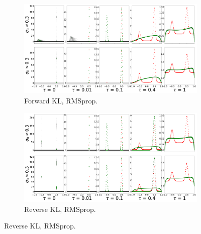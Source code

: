 \documentclass{article}
\begin{document}
\begin{figure}[!ht]
  \begin{subfigure}[b]{0.4\linewidth}
    \centering
    \includegraphics[width=1\columnwidth]{figs/bandit/notlearnQ/modes=1/rmsprop/pdf_forward_optim=rmsprop_modes=1_lr=0.01.png}
    \caption{Forward KL, RMSprop.}
    \label{fig:bandit-pdf-forward-rmsprop}
  \end{subfigure}%
  \begin{subfigure}[b]{0.4\linewidth}
    \centering
    \includegraphics[width=1\columnwidth]{figs/bandit/notlearnQ/modes=1/rmsprop/pdf_reverse_optim=rmsprop_modes=1_lr=0.01.png}
    \caption{Reverse KL, RMSprop.}
    \label{fig:bandit-pdf-reverse-rmsprop}
  \end{subfigure}
  

\end{figure}
\end{document}
